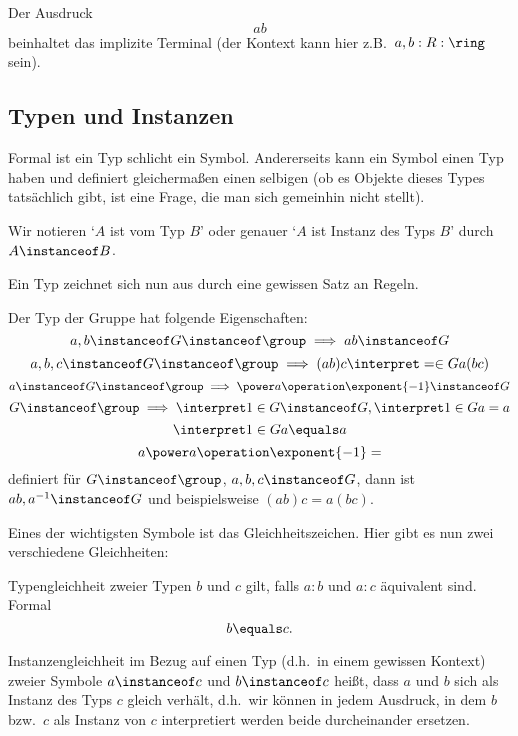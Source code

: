 \begin{example}
    Der Ausdruck
    $$
    ab
    $$
    beinhaltet das implizite Terminal (der Kontext kann hier z.B.~$a,b:R:\ring$ sein).
\end{example}

\subsection{Typen und Instanzen}

Formal ist ein Typ schlicht ein Symbol. Andererseits kann ein Symbol einen Typ haben und
definiert gleichermaßen einen selbigen (ob es
Objekte dieses Types tatsächlich gibt, ist eine Frage, die man sich gemeinhin nicht stellt).

\begin{notation}
    Wir notieren `$A$ ist vom Typ $B$' oder genauer `$A$ ist Instanz des Typs $B$' durch
$A\instanceof B$.
\end{notation}

Ein Typ zeichnet sich nun aus durch eine gewissen Satz an Regeln.

\begin{example}[Gruppen]
    Der Typ der Gruppe hat folgende Eigenschaften:
    $$
    a,b\instanceof G\instanceof\group\implies ab\instanceof G
    $$
    $$
    a,b,c\instanceof G\instanceof \group\implies (ab)c\interpret=\in G a(bc)
    $$
    $$
    a\instanceof G\instanceof\group\implies \power a\operation\exponent{-1}\instanceof G
    $$
    $$
    G\instanceof\group\implies \interpret 1\in G\instanceof G,\interpret 1\in G a=a
    $$
    $$
    \interpret 1\in G a\equals a
    $$
    $$
    a\power a\operation\exponent{-1}=
    $$
    definiert für
    $G\instanceof\group$, $a,b,c\instanceof G$, dann ist $ab,a^{-1}\instanceof G$ und beispielsweise $(ab)c=a(bc)$. 
\end{example}


Eines der wichtigsten Symbole ist das Gleichheitszeichen. Hier gibt es nun zwei verschiedene
Gleichheiten:

Typengleichheit zweier Typen $b$ und $c$ gilt, falls $a:b$ und $a:c$ äquivalent sind.
Formal
$$
b\equals c.
$$

Instanzengleichheit im Bezug auf einen Typ (d.h.~in einem gewissen Kontext) zweier Symbole
$a\instanceof c$
und $b\instanceof c$ heißt, dass $a$ und $b$ sich als Instanz des Typs $c$ gleich verhält, d.h.~wir
können in jedem Ausdruck, in dem $b$ bzw.~$c$ als Instanz von $c$ interpretiert werden beide
durcheinander ersetzen.

